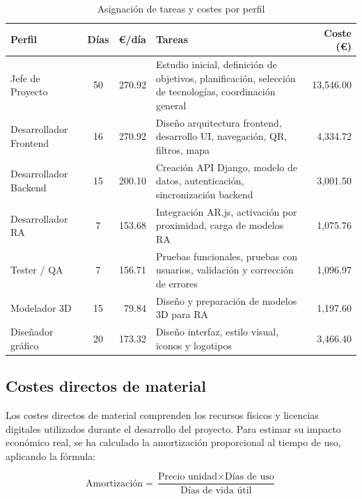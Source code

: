 \begin{table}[H]
\centering
\caption{Asignación de tareas y costes por perfil}
\begin{tabular}{|l|c|r|p{6.5cm}|r|}
\hline
\textbf{Perfil} & \textbf{Días} & \textbf{€/día} & \textbf{Tareas} & \textbf{Coste (€)} \\
\hline
Jefe de Proyecto & 50 & 270.92 & Estudio inicial, definición de objetivos, planificación, selección de tecnologías, coordinación general & 13,546.00 \\
\hline
Desarrollador Frontend & 16 & 270.92 & Diseño arquitectura frontend, desarrollo UI, navegación, QR, filtros, mapa & 4,334.72 \\
\hline
Desarrollador Backend & 15 & 200.10 & Creación API Django, modelo de datos, autenticación, sincronización backend & 3,001.50 \\
\hline
Desarrollador RA & 7 & 153.68 & Integración AR.js, activación por proximidad, carga de modelos RA & 1,075.76 \\
\hline
Tester / QA & 7 & 156.71 & Pruebas funcionales, pruebas con usuarios, validación y corrección de errores & 1,096.97 \\
\hline
Modelador 3D & 15 & 79.84 & Diseño y preparación de modelos 3D para RA & 1,197.60 \\
\hline
Diseñador gráfico & 20 & 173.32 & Diseño interfaz, estilo visual, iconos y logotipos & 3,466.40 \\
\hline
\end{tabular}
\end{table}

\subsection{Costes directos de material}

Los costes directos de material comprenden los recursos físicos y licencias digitales utilizados durante el desarrollo del proyecto. Para estimar su impacto económico real, se ha calculado la amortización proporcional al tiempo de uso, aplicando la fórmula:

\[
\text{Amortización} = \frac{\text{Precio unidad} \times \text{Días de uso}}{\text{Días de vida útil}}
\]


